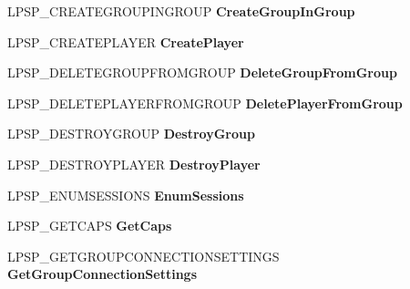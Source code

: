 \begin{DoxyCompactItemize}
\mbox{\label{struct_s_p___c_a_l_l_b_a_c_k_s_ad5e9997ca8f99cc6f918f66d9f31c5ff}} 
L\+P\+S\+P\+\_\+\+C\+R\+E\+A\+T\+E\+G\+R\+O\+U\+P\+I\+N\+G\+R\+O\+UP {\bfseries Create\+Group\+In\+Group}
\item 
\mbox{\label{struct_s_p___c_a_l_l_b_a_c_k_s_aa375357d039f6598b07c7bf316bd45ad}} 
L\+P\+S\+P\+\_\+\+C\+R\+E\+A\+T\+E\+P\+L\+A\+Y\+ER {\bfseries Create\+Player}
\item 
\mbox{\label{struct_s_p___c_a_l_l_b_a_c_k_s_a4d8072768af518f612148a30dac01e86}} 
L\+P\+S\+P\+\_\+\+D\+E\+L\+E\+T\+E\+G\+R\+O\+U\+P\+F\+R\+O\+M\+G\+R\+O\+UP {\bfseries Delete\+Group\+From\+Group}
\item 
\mbox{\label{struct_s_p___c_a_l_l_b_a_c_k_s_a7df5a74dc5e4af48986776e40bc47ef9}} 
L\+P\+S\+P\+\_\+\+D\+E\+L\+E\+T\+E\+P\+L\+A\+Y\+E\+R\+F\+R\+O\+M\+G\+R\+O\+UP {\bfseries Delete\+Player\+From\+Group}
\item 
\mbox{\label{struct_s_p___c_a_l_l_b_a_c_k_s_a3e87a6d4927ff09453f05229201e5fd7}} 
L\+P\+S\+P\+\_\+\+D\+E\+S\+T\+R\+O\+Y\+G\+R\+O\+UP {\bfseries Destroy\+Group}
\item 
\mbox{\label{struct_s_p___c_a_l_l_b_a_c_k_s_a4fd6bfa7e0a0de22173b98e9e512b394}} 
L\+P\+S\+P\+\_\+\+D\+E\+S\+T\+R\+O\+Y\+P\+L\+A\+Y\+ER {\bfseries Destroy\+Player}
\item 
\mbox{\label{struct_s_p___c_a_l_l_b_a_c_k_s_a96e9924e242046773dc17e7cc3c5f345}} 
L\+P\+S\+P\+\_\+\+E\+N\+U\+M\+S\+E\+S\+S\+I\+O\+NS {\bfseries Enum\+Sessions}
\item 
\mbox{\label{struct_s_p___c_a_l_l_b_a_c_k_s_aeddbb590fc5521792e3a3b05a2e531e4}} 
L\+P\+S\+P\+\_\+\+G\+E\+T\+C\+A\+PS {\bfseries Get\+Caps}
\item 
\mbox{\label{struct_s_p___c_a_l_l_b_a_c_k_s_a6ce20d19ac9c251ed1ebd0866bf92ea6}} 
L\+P\+S\+P\+\_\+\+G\+E\+T\+G\+R\+O\+U\+P\+C\+O\+N\+N\+E\+C\+T\+I\+O\+N\+S\+E\+T\+T\+I\+N\+GS {\bfseries Get\+Group\+Connection\+Settings}

\end{DoxyCompactItemize}
